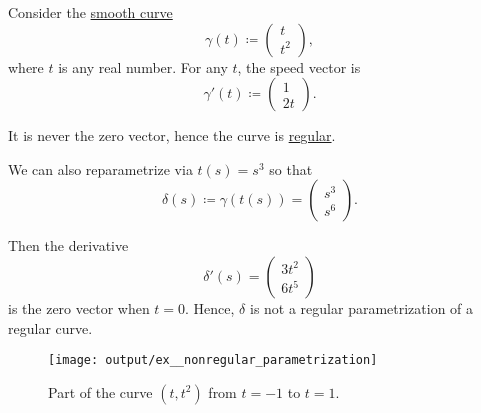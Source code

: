 \begin{example}\label{ex:nonregular_parametrization}
  Consider the \hyperref[def:smooth_curve]{smooth curve}
  \begin{equation*}
    \gamma(t)
    \coloneqq
    \begin{pmatrix}
      t \\ t^2
    \end{pmatrix},
  \end{equation*}
  where \( t \) is any real number. For any \( t \), the speed vector is
  \begin{equation*}
    \gamma'(t)
    \coloneqq
    \begin{pmatrix}
      1 \\ 2t
    \end{pmatrix}.
  \end{equation*}

  It is never the zero vector, hence the curve is \hyperref[def:regular_curve]{regular}.

  We can also reparametrize via \( t(s) = s^3 \) so that
  \begin{equation*}
    \delta(s)
    \coloneqq
    \gamma(t(s))
    =
    \begin{pmatrix}
      s^3 \\ s^6
    \end{pmatrix}.
  \end{equation*}

  Then the derivative
  \begin{equation*}
    \delta'(s)
    =
    \begin{pmatrix}
      3t^2 \\ 6t^5
    \end{pmatrix}
  \end{equation*}
  is the zero vector when \( t = 0 \). Hence, \( \delta \) is not a regular parametrization of a regular curve.

  \begin{figure}[!ht]
    \centering
    \texttt{[image: output/ex\_\_nonregular\_parametrization]}
    \caption{Part of the curve \( (t, t^2) \) from \( t = -1 \) to \( t = 1 \).}\label{fig:ex:nonregular_parametrization}
  \end{figure}
\end{example}

